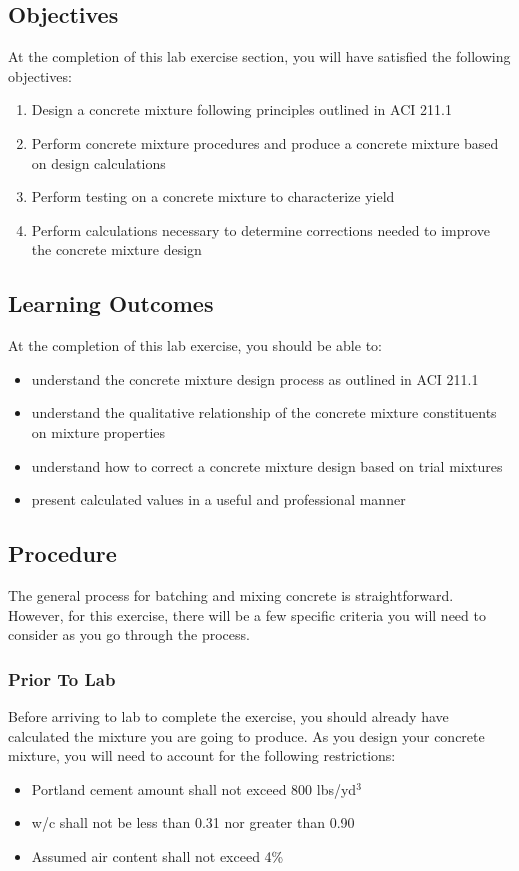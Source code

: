\documentclass[12pt]{article}
\begin{document}
\subsection{Objectives}
\label{ssec:headingscap}
At the completion of this lab exercise section, you will have satisfied the following objectives:
\begin{enumerate}
    \item Design a concrete mixture following principles outlined in ACI 211.1
    \item Perform concrete mixture procedures and produce a concrete mixture based on design calculations
    \item Perform testing on a concrete mixture to characterize yield
    \item Perform calculations necessary to determine corrections needed to improve the concrete mixture design
\end{enumerate}

\subsection{Learning Outcomes}
At the completion of this lab exercise, you should be able to:
\begin{itemize}
    \item understand the concrete mixture design process as outlined in ACI 211.1
    \item understand the qualitative relationship of the concrete mixture constituents on mixture properties
    \item understand how to correct a concrete mixture design based on trial mixtures
    \item present calculated values in a useful and professional manner
\end{itemize}

\pagebreak
\subsection{Procedure}
The general process for batching and mixing concrete is straightforward. However, for this exercise, there will be a few specific criteria you will need to consider as you go through the process.

\subsubsection{Prior To Lab}
Before arriving to lab to complete the exercise, you should already have calculated the mixture you are going to produce. As you design your concrete mixture, you will need to account for the following restrictions:
\begin{itemize}
    \item Portland cement amount shall not exceed 800 lbs/yd$^3$
    \item w/c shall not be less than 0.31 nor greater than 0.90
    \item Assumed air content shall not exceed 4\%
\end{itemize}
\end{document}
